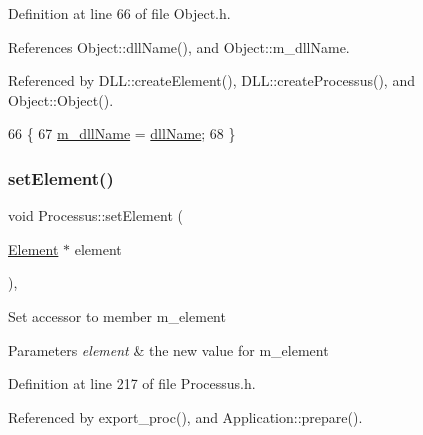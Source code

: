 Definition at line 66 of file Object.\+h.



References Object\+::dll\+Name(), and Object\+::m\+\_\+dll\+Name.



Referenced by D\+L\+L\+::create\+Element(), D\+L\+L\+::create\+Processus(), and Object\+::\+Object().


\begin{DoxyCode}
66                                       \{
67     \hyperlink{classObject_a01afbeacebb8db6831559972ec362eb3}{m\_dllName} = \hyperlink{classObject_a2e3947f2870094c332d7454117f3ec63}{dllName};
68   \}
\end{DoxyCode}
\mbox{\label{classProcessus_a8ddef94227d83d9dae2cd49aebc33353}} 
\subsubsection{\texorpdfstring{set\+Element()}{setElement()}}
{\footnotesize\ttfamily void Processus\+::set\+Element (\begin{DoxyParamCaption}\item[{\hyperlink{classElement}{Element} $\ast$}]{element }\end{DoxyParamCaption})\hspace{0.3cm}{\ttfamily [inline]}, {\ttfamily [inherited]}}

Set accessor to member m\+\_\+element 
\begin{DoxyParams}{Parameters}
{\em element} & the new value for m\+\_\+element \\
\hline
\end{DoxyParams}


Definition at line 217 of file Processus.\+h.



Referenced by export\+\_\+proc(), and Application\+::prepare().


